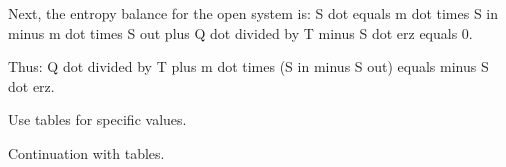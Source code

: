 Next, the entropy balance for the open system is:  
S dot equals m dot times S in minus m dot times S out plus Q dot divided by T minus S dot erz equals 0.  

Thus:  
Q dot divided by T plus m dot times (S in minus S out) equals minus S dot erz.  

Use tables for specific values.  

Continuation with tables.